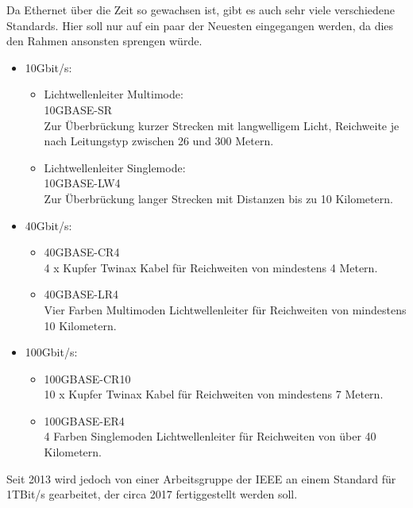 \documentclass[12pt,a4paper]{report}
\begin{document}
Da Ethernet über die Zeit so gewachsen ist, gibt es auch sehr viele verschiedene Standards. Hier soll nur auf ein paar der Neuesten eingegangen werden, da dies den Rahmen ansonsten sprengen würde.\\
\begin{itemize}
\item 10Gbit/s:
\begin{itemize}
\item Lichtwellenleiter Multimode:\\
10GBASE-SR\\
Zur Überbrückung kurzer Strecken mit langwelligem Licht, Reichweite je nach Leitungstyp zwischen 26 und 300 Metern.
\item Lichtwellenleiter Singlemode:\\
10GBASE-LW4\\
Zur Überbrückung langer Strecken mit Distanzen bis zu 10 Kilometern.
\end{itemize}
\item 40Gbit/s:
\begin{itemize}
\item 40GBASE-CR4\\
4 x Kupfer Twinax Kabel für Reichweiten von mindestens 4 Metern.
\item 40GBASE-LR4\\
Vier Farben Multimoden Lichtwellenleiter für Reichweiten von mindestens 10 Kilometern.
\end{itemize}
\item 100Gbit/s:
\begin{itemize}
\item 100GBASE-CR10\\
10 x Kupfer Twinax Kabel für Reichweiten von mindestens 7 Metern.
\item 100GBASE-ER4\\
4 Farben Singlemoden Lichtwellenleiter für Reichweiten von über 40 Kilometern.
\end{itemize}
\end{itemize}
Seit 2013 wird jedoch von einer Arbeitsgruppe der IEEE an einem Standard für 1TBit/s gearbeitet, der circa 2017 fertiggestellt werden soll.\\
\end{document}
